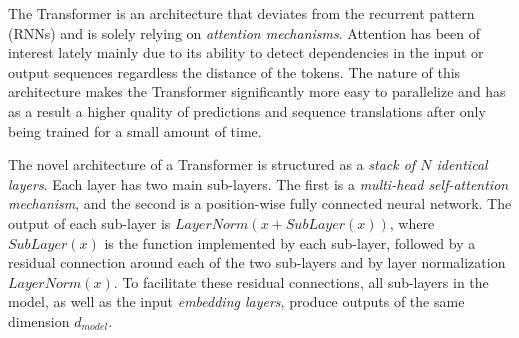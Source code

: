 
The Transformer is an \dnn architecture that deviates from the recurrent pattern
(\eg RNNs) and is solely relying on \emph{attention mechanisms}. Attention has
been of interest lately \citep{Bahdanau2015, Kim2017, Vaswani_2017} mainly due
to its ability to detect dependencies in the input or output sequences
regardless the distance of the tokens. The nature of this architecture makes the
Transformer significantly more easy to parallelize and has as a result a higher
quality of predictions and sequence translations after only being trained for a
small amount of time.

The novel architecture of a Transformer \citep{Vaswani_2017} is structured as a
\emph{stack of $N$ identical layers}. Each layer has two main sub-layers. The
first is a \emph{multi-head self-attention mechanism}, and the second is a
position-wise fully connected neural network. The output of each sub-layer is
$LayerNorm(x + SubLayer(x))$, where $SubLayer(x)$ is the function implemented by
each sub-layer, followed by a residual connection around each of the two
sub-layers and  by layer normalization $LayerNorm(x)$. To facilitate these
residual connections, all sub-layers in the model, as well as the input
\emph{embedding layers}, produce outputs of the same dimension $d_{model}$.


